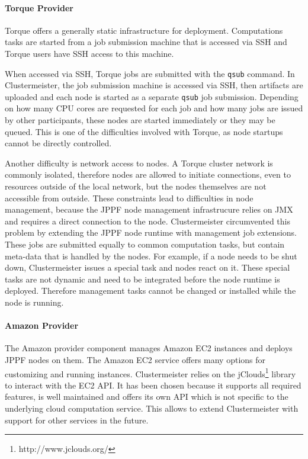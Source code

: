\documentclass[english]{uzhpub}
\begin{document}
\paragraph{Torque Provider}
\label{implementation-torque}

Torque offers a generally static infrastructure for deployment. Computations tasks are started from a job submission machine that is accessed via SSH and Torque users have SSH access to this machine.

When accessed via SSH, Torque jobs are submitted with the \texttt{qsub} command. In Clustermeister, the job submission machine is accessed via SSH, then artifacts are uploaded and each node is started as a separate \texttt{qsub} job submission. Depending on how many CPU cores are requested for each job and how many jobs are issued by other participants, these nodes are started immediately or they may be queued. This is one of the difficulties involved with Torque, as node startups cannot be directly controlled.

Another difficulty is network access to nodes. A Torque cluster network is commonly isolated, therefore nodes are allowed to initiate connections, even to resources outside of the local network, but the nodes themselves are not accessible from outside. These constraints lead to difficulties in node management, because the JPPF node management infrastrucure relies on JMX and requires a direct connection to the node. Clustermeister circumvented this problem by extending the JPPF node runtime with management job extensions. These jobs are submitted equally to common computation tasks, but contain meta-data that is handled by the nodes. For example, if a node needs to be shut down, Clustermeister issues a special task and nodes react on it. These special tasks are not dynamic and need to be integrated before the node runtime is deployed. Therefore management tasks cannot be changed or installed while the node is running.

\paragraph{Amazon Provider}
The Amazon provider component manages Amazon EC2 instances and deploys JPPF nodes on them. The Amazon EC2 service offers many options for customizing and running instances. Clustermeister relies on the jClouds\footnote{http://www.jclouds.org/} library to interact with the EC2 API. It has been chosen because it supports all required features, is well maintained and offers its own API which is not specific to the underlying cloud computation service. This allows to extend Clustermeister with support for other services in the future.
\end{document}
